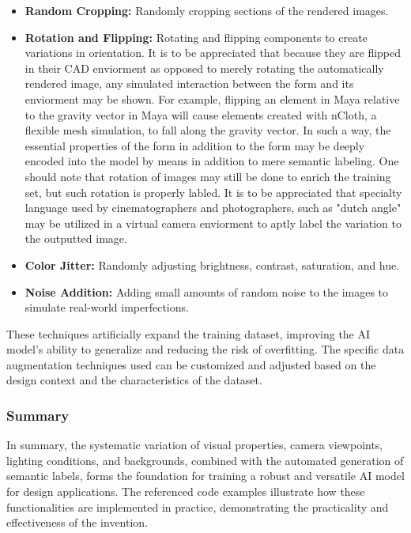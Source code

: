\documentclass[12pt]{report}
\begin{document}
\begin{itemize}
    \item \textbf{Random Cropping:} Randomly cropping sections of the rendered images.
    \item \textbf{Rotation and Flipping:} Rotating and flipping components to create variations in orientation. It is to be appreciated that because they are flipped in their CAD enviorment as opposed to merely rotating the automatically rendered image, any simulated interaction between the form and its enviorment may be shown. For example, flipping an element in Maya relative to the gravity vector in Maya will cause elements created with nCloth, a flexible mesh simulation, to fall along the gravity vector. In such a way, the essential properties of the form in addition to the form may be deeply encoded into the model by means in addition to mere semantic labeling. One should note that rotation of images may still be done to enrich the training set, but such rotation is properly labled. It is to be appreciated that specialty language used by cinematographers and photographers, such as "dutch angle" may be utilized in a virtual camera enviorment to aptly label the variation to the outputted image. 
    \item \textbf{Color Jitter:} Randomly adjusting brightness, contrast, saturation, and hue.
    \item \textbf{Noise Addition:} Adding small amounts of random noise to the images to simulate real-world imperfections.
\end{itemize}

These techniques artificially expand the training dataset, improving the AI model's ability to generalize and reducing the risk of overfitting. The specific data augmentation techniques used can be customized and adjusted based on the design context and the characteristics of the dataset.

\subsubsection{Summary}

In summary, the systematic variation of visual properties, camera viewpoints, lighting conditions, and backgrounds, combined with the automated generation of semantic labels, forms the foundation for training a robust and versatile AI model for design applications. The referenced code examples illustrate how these functionalities are implemented in practice, demonstrating the practicality and effectiveness of the invention.
\end{document}
